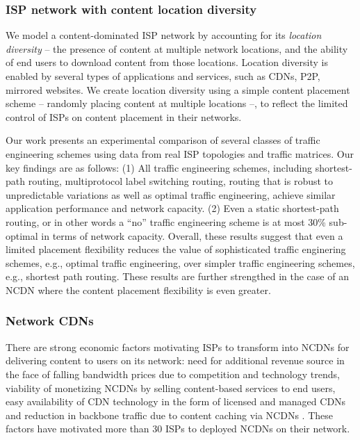 \subsubsection{ISP network with content location diversity}

We model a content-dominated ISP network by accounting for its \emph{location diversity} -- the presence of content at multiple network locations, and the ability of end users to download content from those locations. Location diversity is enabled by several types of applications and services, such as CDNs, P2P, mirrored websites. We create location diversity using a simple content placement scheme -- randomly placing content at multiple locations --, to reflect the limited control of ISPs on content placement in their networks. 


Our work presents an experimental comparison of several classes of traffic engineering schemes using data from real ISP topologies and traffic matrices. Our key findings are as follows: (1) All traffic engineering schemes, including shortest-path routing, multiprotocol label switching routing, routing that is robust to unpredictable variations as well as optimal traffic engineering, achieve similar application performance and network capacity.   (2) Even a static shortest-path routing, or in other words a ``no'' traffic engineering  scheme is at most 30\% sub-optimal in terms of network capacity. Overall, these results suggest that even a limited placement flexibility reduces the value of sophisticated traffic enginering schemes, e.g., optimal traffic engineering, over simpler traffic engineering schemes, e.g., shortest path routing. These results are further strengthed in the case of an NCDN where the content placement flexibility is even greater.


\subsubsection{Network CDNs}

There are strong economic factors motivating ISPs to transform into NCDNs for delivering content to users on its network: need for additional revenue source in the face of falling bandwidth prices due to competition and technology trends, viability of monetizing NCDNs by selling content-based services to end users, easy availability of CDN technology in the form of licensed and managed CDNs and reduction in backbone traffic due to content caching via NCDNs \cite{telco-cdn-arguments}. These factors have motivated more than 30 ISPs to deployed NCDNs on their network.

